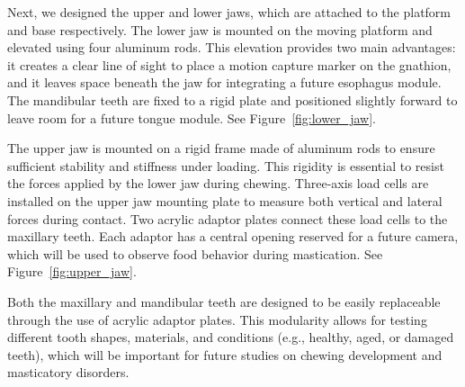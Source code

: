 Next, we designed the upper and lower jaws, which are attached to the platform and base respectively. The lower jaw is mounted on the 
moving platform and elevated using four aluminum rods. This elevation provides two main advantages: it creates a clear line of sight to 
place a motion capture marker on the gnathion, and it leaves space beneath the jaw for integrating a future esophagus module. The 
mandibular teeth are fixed to a rigid plate and positioned slightly forward to leave room for a future tongue module. See Figure~\ref{fig:lower_jaw}.

The upper jaw is mounted on a rigid frame made of aluminum rods to ensure sufficient stability and stiffness under loading. This 
rigidity is essential to resist the forces applied by the lower jaw during chewing. Three-axis load cells are installed on the 
upper jaw mounting plate to measure both vertical and lateral forces during contact. Two acrylic adaptor plates connect these load 
cells to the maxillary teeth. Each adaptor has a central opening reserved for a future camera, which will be used to observe food 
behavior during mastication. See Figure~\ref{fig:upper_jaw}.

Both the maxillary and mandibular teeth are designed to be easily replaceable through the use of acrylic adaptor plates. This modularity 
allows for testing different tooth shapes, materials, and conditions (e.g., healthy, aged, or damaged teeth), which will be important for 
future studies on chewing development and masticatory disorders.

